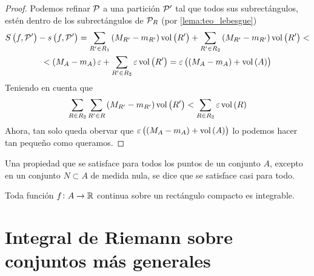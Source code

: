 \begin{proof}
    Podemos refinar $\mathcal{P}$ a una partición $\mathcal{P}^\prime$ tal que todos sus
    subrectángulos, est\'en dentro de los subrectángulos de $\mathcal{P}_R$ (por \ref{lema:teo_lebesgue})
    \begin{gather*}
        S\left( f, \mathcal{P}^\prime \right) - s\left( f, \mathcal{P}^\prime \right) =
        \sum_{R^\prime \in R_1} \left( M_{R^\prime} - m_{R^\prime} \right)
        \operatorname{vol} \left( R^\prime \right) + \sum_{R^\prime \in R_2}
        \left( M_{R^\prime} - m_{R^\prime}\right) \operatorname{vol}\left( R^\prime \right)
        < \\ < \left( M_A - m_A \right)\varepsilon + \sum_{R^\prime \in R_2}
        \varepsilon \operatorname{vol}\left( R^\prime \right) = \varepsilon \left(
        \left( M_A - m_A \right) + \operatorname{vol} \left( A \right)\right)
    \end{gather*}
    Teniendo en cuenta que
    \[
        \sum_{R \in R_2} \sum_{R^\prime \in R} \left( M_{R^\prime} -
        m_{R^\prime}\right) \operatorname{vol}\left( R^\prime \right) < \sum_{R \in R_2}
        \varepsilon \operatorname{vol}\left( R \right)
    \]
    Ahora, tan solo queda obervar que $\varepsilon \left( \left( M_A - m_A \right)
    + \operatorname{vol} \left( A \right)\right)$ lo podemos hacer tan pequeño como queramos.
\end{proof}

\begin{defi}
    Una propiedad que se satisface para todos los puntos de un conjunto $A$,
    excepto en un conjunto $N \subset A$ de medida nula, se dice que se satisface
    casi para todo.
\end{defi}

\begin{prop}
    Toda función $f \colon A \to \mathbb{R}$ continua sobre un rectángulo compacto es
    integrable.
\end{prop}

\section{Integral de Riemann sobre conjuntos más generales}

